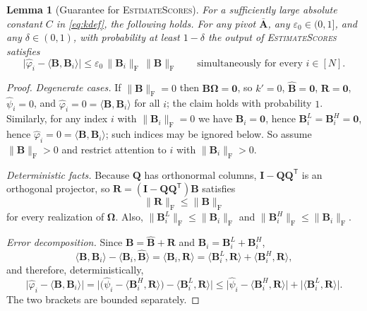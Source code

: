 \documentclass{article}
\renewcommand{\vec}[1]{\mathbf{#1}}          %
\newcommand{\T}{\mathsf{T}}                  %
\newcommand{\F}{\mathrm{F}}                  %
\newcommand{\eps}{\varepsilon}
\newcommand{\inner}[2]{\langle #1, #2 \rangle}
\newtheorem{lemma}[theorem]{Lemma}
\theoremstyle{remark}
\begin{document}
\begin{lemma}[Guarantee for \textsc{EstimateScores}]\label{lem:estimate}
For a sufficiently large absolute constant $C$ in \cref{eq:kdef}, the following holds.
For any pivot $\bar{\vec{A}}$, any $\eps_0 \in (0,1]$, and any $\delta \in (0,1)$, with probability at least $1 - \delta$ the output of \textsc{EstimateScores} satisfies
\[
\bigl| \hat{\varphi}_i - \inner{\vec{B}}{\vec{B}_i} \bigr| \le \eps_0 \, \|\vec{B}_i\|_\F \, \|\vec{B}\|_\F
\qquad\text{simultaneously for every } i \in [N].
\]
\end{lemma}

\begin{proof}
\emph{Degenerate cases.}
If $\|\vec{B}\|_\F = 0$ then $\vec{B}\vec{\Omega} = \vec 0$, so $k' = 0$, $\widehat{\vec{B}} = \vec 0$, $\vec R = \vec 0$, $\hat\psi_i = 0$, and $\hat\varphi_i = 0 = \inner{\vec{B}}{\vec{B}_i}$ for all $i$; the claim holds with probability $1$.
Similarly, for any index $i$ with $\|\vec{B}_i\|_\F = 0$ we have $\vec{B}_i = \vec 0$, hence $\vec{B}_i^L = \vec{B}_i^H = \vec 0$, hence $\hat\varphi_i = 0 = \inner{\vec{B}}{\vec{B}_i}$; such indices may be ignored below.
So assume $\|\vec{B}\|_\F > 0$ and restrict attention to $i$ with $\|\vec{B}_i\|_\F > 0$.

\emph{Deterministic facts.}
Because $\vec{Q}$ has orthonormal columns, $\vec{I} - \vec{Q}\vec{Q}^\T$ is an orthogonal projector, so $\vec R = (\vec I - \vec Q\vec Q^\T)\vec B$ satisfies
\begin{equation}\label{eq:orth}
\|\vec{R}\|_\F \le \|\vec{B}\|_\F
\end{equation}
for every realization of $\vec{\Omega}$.
Also, $\|\vec{B}_i^L\|_\F \le \|\vec{B}_i\|_\F$ and $\|\vec{B}_i^H\|_\F \le \|\vec{B}_i\|_\F$.

\emph{Error decomposition.}
Since $\vec{B} = \widehat{\vec{B}} + \vec{R}$ and $\vec{B}_i = \vec{B}_i^L + \vec{B}_i^H$,
\[
\inner{\vec{B}}{\vec{B}_i} - \inner{\vec{B}_i}{\widehat{\vec{B}}}
= \inner{\vec{B}_i}{\vec{R}}
= \inner{\vec{B}_i^L}{\vec{R}} + \inner{\vec{B}_i^H}{\vec{R}},
\]
and therefore, deterministically,
\begin{equation}\label{eq:errsplit}
\bigl| \hat{\varphi}_i - \inner{\vec{B}}{\vec{B}_i} \bigr|
= \bigl|  \bigl( \hat{\psi}_i - \inner{\vec{B}_i^H}{\vec{R}} \bigr) - \inner{\vec{B}_i^L}{\vec{R}} \bigr|
\leq \bigl|  \hat{\psi}_i - \inner{\vec{B}_i^H}{\vec{R}} \bigr| + \bigl| \inner{\vec{B}_i^L}{\vec{R}} \bigr|.
\end{equation}
The two brackets are bounded separately.


\end{proof}
\end{document}
